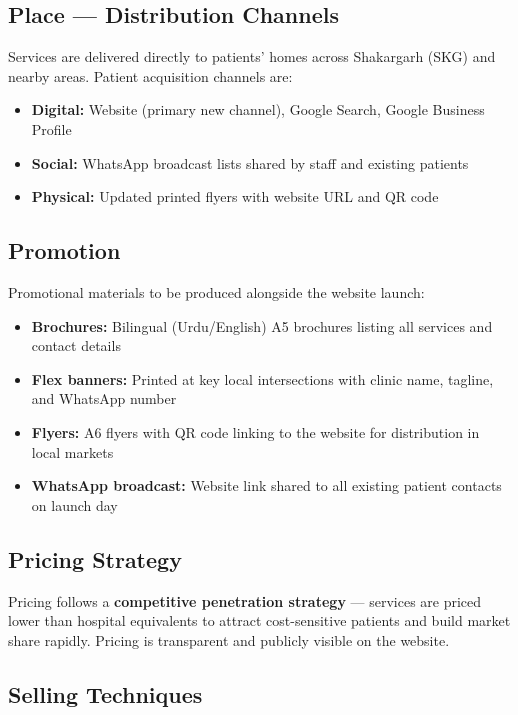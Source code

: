 \documentclass[12pt, a4paper]{article}
\begin{document}
\subsection{Place — Distribution Channels}

Services are delivered directly to patients' homes across Shakargarh (SKG) and nearby areas. Patient acquisition channels are:

\begin{itemize}[leftmargin=1.4em]
    \item \textbf{Digital:} Website (primary new channel), Google Search, Google Business Profile
    \item \textbf{Social:} WhatsApp broadcast lists shared by staff and existing patients
    \item \textbf{Physical:} Updated printed flyers with website URL and QR code
\end{itemize}

\subsection{Promotion}

Promotional materials to be produced alongside the website launch:

\begin{itemize}[leftmargin=1.4em]
    \item \textbf{Brochures:} Bilingual (Urdu/English) A5 brochures listing all services and contact details
    \item \textbf{Flex banners:} Printed at key local intersections with clinic name, tagline, and WhatsApp number
    \item \textbf{Flyers:} A6 flyers with QR code linking to the website for distribution in local markets
    \item \textbf{WhatsApp broadcast:} Website link shared to all existing patient contacts on launch day
\end{itemize}

\subsection{Pricing Strategy}

Pricing follows a \textbf{competitive penetration strategy} — services are priced lower than hospital equivalents to attract cost-sensitive patients and build market share rapidly. Pricing is transparent and publicly visible on the website.

\subsection{Selling Techniques}
\end{document}
